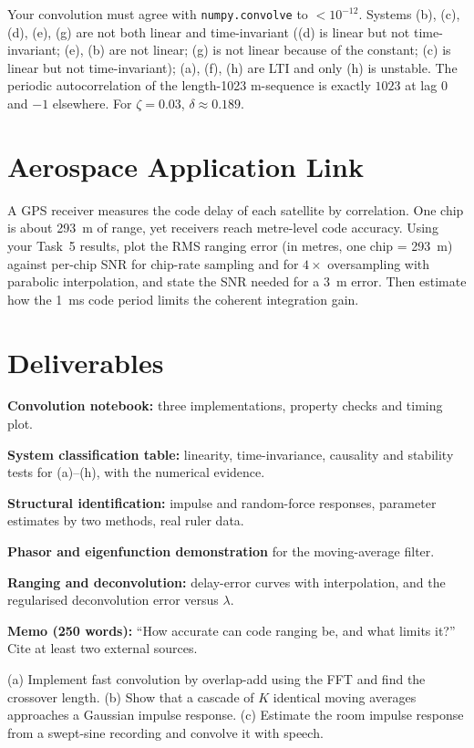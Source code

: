 \documentclass[11pt,a4paper]{article}
\begin{document}
\begin{checkpoint}
Your convolution must agree with \texttt{numpy.convolve} to $<10^{-12}$. Systems (b), (c), (d), (e), (g) are not both linear and time-invariant ((d) is linear but not time-invariant; (e), (b) are not linear; (g) is not linear because of the constant; (c) is linear but not time-invariant); (a), (f), (h) are LTI and only (h) is unstable. The periodic autocorrelation of the length-1023 m-sequence is exactly $1023$ at lag $0$ and $-1$ elsewhere. For $\zeta=0.03$, $\delta\approx0.189$.
\end{checkpoint}

\section*{Aerospace Application Link}
A GPS receiver measures the code delay of each satellite by correlation. One chip is about \SI{293}{\metre} of range, yet receivers reach metre-level code accuracy. Using your Task~5 results, plot the RMS ranging error (in metres, one chip = \SI{293}{\metre}) against per-chip SNR for chip-rate sampling and for $4\times$ oversampling with parabolic interpolation, and state the SNR needed for a \SI{3}{\metre} error. Then estimate how the \SI{1}{\milli\second} code period limits the coherent integration gain.

\section*{Deliverables}
\begin{delivs}
  \item[D1] \textbf{Convolution notebook:} three implementations, property checks and timing plot.
  \item[D2] \textbf{System classification table:} linearity, time-invariance, causality and stability tests for (a)--(h), with the numerical evidence.
  \item[D3] \textbf{Structural identification:} impulse and random-force responses, parameter estimates by two methods, real ruler data.
  \item[D4] \textbf{Phasor and eigenfunction demonstration} for the moving-average filter.
  \item[D5] \textbf{Ranging and deconvolution:} delay-error curves with interpolation, and the regularised deconvolution error versus $\lambda$.
  \item[D6] \textbf{Memo (250 words):} ``How accurate can code ranging be, and what limits it?'' Cite at least two external sources.
  \item[Bonus] (a) Implement fast convolution by overlap-add using the FFT and find the crossover length. (b) Show that a cascade of $K$ identical moving averages approaches a Gaussian impulse response. (c) Estimate the room impulse response from a swept-sine recording and convolve it with speech.
\end{delivs}
\end{document}
